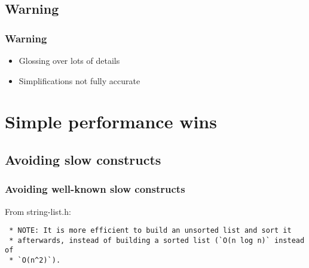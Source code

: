 \documentclass[compress,t]{beamer}
\begin{document}

\subsection*{Warning}
\begin{frame}
  \frametitle{Warning}

  \vfill
  \begin{center}
    \begin{minipage}{0.55\textwidth}
    \begin{itemize}
      \item Glossing over lots of details
      \item Simplifications not fully accurate
    \end{itemize}
    \end{minipage}
  \end{center}
\end{frame}

\section[Simple Wins]{Simple performance wins}

\subsection[Slow Constructs]{Avoiding slow constructs}
\begin{frame}[fragile]
  \frametitle{Avoiding well-known slow constructs}

  From string-list.h:
  {\scriptsize
  \vspace*{-0.5\baselineskip}
  \begin{verbatim}
 * NOTE: It is more efficient to build an unsorted list and sort it
 * afterwards, instead of building a sorted list (`O(n log n)` instead of
 * `O(n^2)`).
  \end{verbatim}
  \vspace*{-\baselineskip}
  }

\end{frame}

\end{document}
